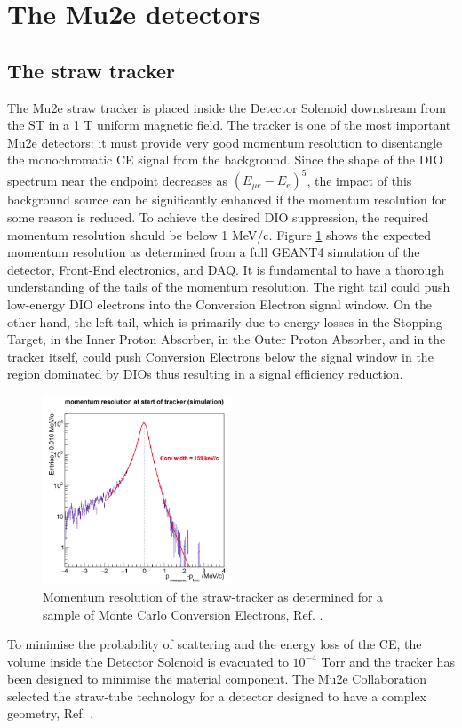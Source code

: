 \section{The Mu2e detectors}
\subsection{The straw tracker}\label{trackersec}
The Mu2e straw tracker is placed inside the Detector Solenoid downstream from 
the ST in a 1 T uniform magnetic field. The tracker is one of the most 
important Mu2e detectors: it must provide very good momentum resolution to 
disentangle the monochromatic CE signal from the background. 
Since the shape of the DIO spectrum near the endpoint decreases as 
$(E_{\mu e} -E_e)^5$, the impact of this background source can be significantly 
enhanced if the momentum resolution for some reason is reduced. 
To achieve the desired DIO suppression, the required momentum resolution should be below 1 MeV/c.  
Figure \ref{fig:trkres} shows the expected momentum resolution as determined 
from a full GEANT4 simulation of the detector, Front-End electronics, and DAQ.
It is fundamental to have a thorough understanding of the tails of the momentum resolution. 
The right tail could push low-energy DIO electrons into the Conversion Electron signal window. 
On the other hand, the left tail, which is primarily due to energy losses in the Stopping Target, 
in the Inner Proton Absorber, in the Outer Proton Absorber, and in the tracker itself, could 
push Conversion Electrons below the signal window in the region dominated by DIOs 
thus resulting in a signal efficiency reduction.
\begin{figure}[!h]
    \centering
    \includegraphics[width =0.5\textwidth]{figures/png/Screenshot_20240330_104830.png}
    \caption[The momentum resolution of the straw-tracker.]{Momentum resolution of the straw-tracker as determined for 
    a sample of Monte Carlo Conversion Electrons, Ref. \cite{bobbb}.}
    \label{fig:trkres}
    \end{figure} 
To minimise the probability of scattering and the energy loss of the CE, 
the volume inside the Detector Solenoid is evacuated to $10^{-4}$ Torr 
and the tracker has been designed to minimise the material component. 
The Mu2e Collaboration selected the straw-tube technology for a detector 
designed to have a complex geometry, Ref. \cite{bobbb}.

